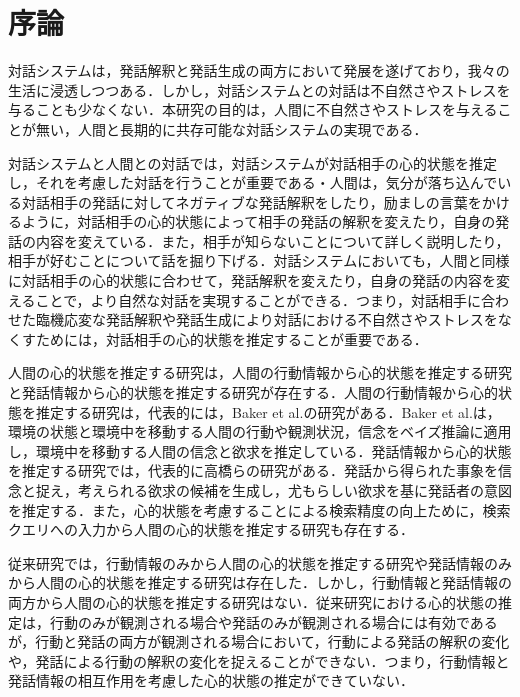 \chapter{序論}

\par
対話システムは，発話解釈と発話生成の両方において発展を遂げており，我々の生活に浸透しつつある．しかし，対話システムとの対話は不自然さやストレスを与ることも少なくない．本研究の目的は，人間に不自然さやストレスを与えることが無い，人間と長期的に共存可能な対話システムの実現である．

\par
対話システムと人間との対話では，対話システムが対話相手の心的状態を推定し，それを考慮した対話を行うことが重要である・人間は，気分が落ち込んでいる対話相手の発話に対してネガティブな発話解釈をしたり，励ましの言葉をかけるように，対話相手の心的状態によって相手の発話の解釈を変えたり，自身の発話の内容を変えている．また，相手が知らないことについて詳しく説明したり，相手が好むことについて話を掘り下げる．対話システムにおいても，人間と同様に対話相手の心的状態に合わせて，発話解釈を変えたり，自身の発話の内容を変えることで，より自然な対話を実現することができる．つまり，対話相手に合わせた臨機応変な発話解釈や発話生成により対話における不自然さやストレスをなくすためには，対話相手の心的状態を推定することが重要である．

\par
人間の心的状態を推定する研究は，人間の行動情報から心的状態を推定する研究と発話情報から心的状態を推定する研究が存在する．人間の行動情報から心的状態を推定する研究は，代表的には，Baker et al.の研究がある．Baker et al.は，環境の状態と環境中を移動する人間の行動や観測状況，信念をベイズ推論に適用し，環境中を移動する人間の信念と欲求を推定している．発話情報から心的状態を推定する研究では，代表的に高橋らの研究がある．発話から得られた事象を信念と捉え，考えられる欲求の候補を生成し，尤もらしい欲求を基に発話者の意図を推定する．また，心的状態を考慮することによる検索精度の向上ために，検索クエリへの入力から人間の心的状態を推定する研究も存在する．

\par
従来研究では，行動情報のみから人間の心的状態を推定する研究や発話情報のみから人間の心的状態を推定する研究は存在した．しかし，行動情報と発話情報の両方から人間の心的状態を推定する研究はない．従来研究における心的状態の推定は，行動のみが観測される場合や発話のみが観測される場合には有効であるが，行動と発話の両方が観測される場合において，行動による発話の解釈の変化や，発話による行動の解釈の変化を捉えることができない．つまり，行動情報と発話情報の相互作用を考慮した心的状態の推定ができていない．

